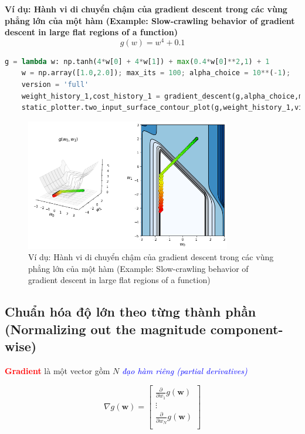 \documentclass{book}
\begin{document}
\textbf{Ví dụ: Hành vi di chuyển chậm của gradient descent trong các vùng phẳng lớn của một hàm (Example: Slow-crawling behavior of gradient descent in large flat regions of a function)}
\begin{equation*}
    g(w) = w^4 + 0.1
\end{equation*}
\begin{lstlisting}[language=Python, caption={Đoạn mã Python thực thi Gradient Descent (phiên bản 'full') trên hàm 2D và vẽ đồ thị đường đồng mức (contour plot).}, label={code:matplotlib_plot_norm_3}]
    g = lambda w: np.tanh(4*w[0] + 4*w[1]) + max(0.4*w[0]**2,1) + 1
    w = np.array([1.0,2.0]); max_its = 100; alpha_choice = 10**(-1);
    version = 'full'
    weight_history_1,cost_history_1 = gradient_descent(g,alpha_choice,max_its,w,version)
    static_plotter.two_input_surface_contour_plot(g,weight_history_1,view = [20,300],num_contours = 20,xmin = -3,xmax = 3,ymin = -5,ymax = 3)
\end{lstlisting}
\begin{figure}[H]
    \centering
    \includegraphics[width=0.8\textwidth]{images/static_plot_each_step_3.png}
    \caption{Ví dụ: Hành vi di chuyển chậm của gradient descent trong các vùng phẳng lớn của một hàm (Example: Slow-crawling behavior of gradient descent in large flat regions of a function)}
\end{figure}
\subsection{Chuẩn hóa độ lớn theo từng thành phần (Normalizing out the magnitude component-wise)}
\textbf{\textcolor{red}{Gradient}} là một vector gồm $N$ \textit{\textcolor{blue}{đạo hàm riêng (partial derivatives)}}

\begin{equation}
    \nabla g(\mathbf{w}) = \begin{bmatrix} 
    \frac{\partial}{\partial w_1}g\left(\mathbf{w}\right) \\
    \vdots \\
    \frac{\partial}{\partial w_N}g\left(\mathbf{w}\right) \\
    \end{bmatrix}
\end{equation}
\end{document}
